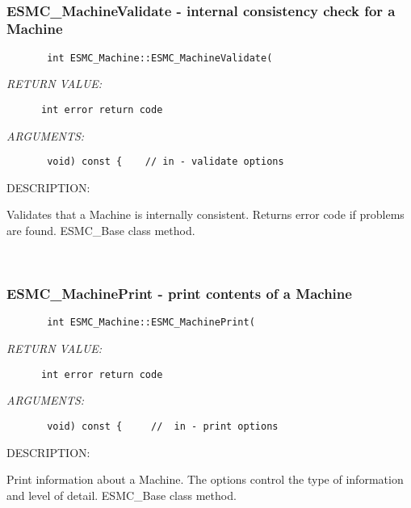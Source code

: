 \mbox{}\hrulefill\ 
 
\subsubsection{ESMC\_MachineValidate - internal consistency check for a Machine}


  
\begin{verbatim}       int ESMC_Machine::ESMC_MachineValidate(\end{verbatim}{\em RETURN VALUE:}
\begin{verbatim}      int error return code\end{verbatim}{\em ARGUMENTS:}
\begin{verbatim}       void) const {    // in - validate options\end{verbatim}
{\sf DESCRIPTION:\\ }


        Validates that a Machine is internally consistent.
        Returns error code if problems are found.  ESMC\_Base class method.
   
 
\mbox{}\hrulefill\ 
 
\subsubsection{ESMC\_MachinePrint - print contents of a Machine}


  
\begin{verbatim}       int ESMC_Machine::ESMC_MachinePrint(\end{verbatim}{\em RETURN VALUE:}
\begin{verbatim}      int error return code\end{verbatim}{\em ARGUMENTS:}
\begin{verbatim}       void) const {     //  in - print options\end{verbatim}
{\sf DESCRIPTION:\\ }


        Print information about a Machine.  The options control the
        type of information and level of detail.  ESMC\_Base class method.
   
 
\mbox{}\hrulefill\ 
 
